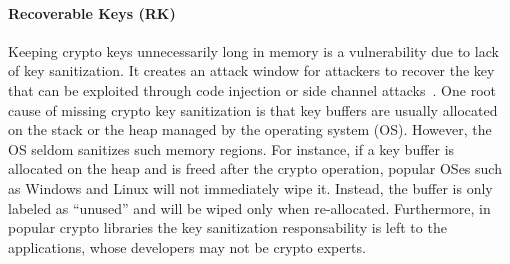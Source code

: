 \paragraph{Recoverable Keys (RK)}
Keeping crypto keys unnecessarily long in memory is a vulnerability due to lack of key sanitization. It creates an attack window for attackers to recover the key that can be exploited through code injection or side channel attacks~\cite{halderman2009lest,harrison2007protecting}.
One root cause of missing crypto key sanitization is that key buffers are usually allocated on the stack or the heap managed by the operating system (OS). However, the OS seldom sanitizes such memory regions.
For instance, if a key buffer is allocated on the heap and is freed after the crypto operation,	popular OSes such as Windows and Linux will not immediately wipe it. 
Instead, the buffer is only labeled as ``unused'' and will be wiped only when re-allocated. 
Furthermore, in popular crypto libraries the key sanitization responsability is left to the applications, whose developers may not be crypto experts.





